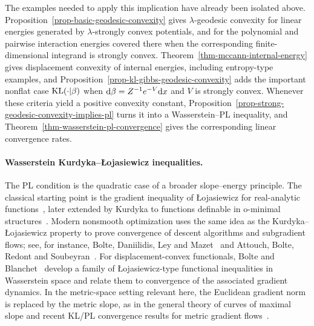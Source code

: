 \begin{rem}\label{rem-classical-convexity-rates}
	The examples needed to apply this implication have already been isolated above. Proposition~\ref{prop-basic-geodesic-convexity} gives \(\lambda\)-geodesic convexity for linear energies generated by \(\lambda\)-strongly convex potentials, and for the polynomial and pairwise interaction energies covered there when the corresponding finite-dimensional integrand is strongly convex. Theorem~\ref{thm-mccann-internal-energy} gives displacement convexity of internal energies, including entropy-type examples, and Proposition~\ref{prop-kl-gibbs-geodesic-convexity} adds the important nonflat case \(\operatorname{KL}(\cdot|\beta)\) when \(\mathrm{d}\beta=Z^{-1}e^{-V}\mathrm{d} x\) and \(V\) is strongly convex. Whenever these criteria yield a positive convexity constant, Proposition~\ref{prop-strong-geodesic-convexity-implies-pl} turns it into a Wasserstein--PL inequality, and Theorem~\ref{thm-wasserstein-pl-convergence} gives the corresponding linear convergence rates.
\end{rem}

\paragraph{Wasserstein Kurdyka--{\L}ojasiewicz inequalities.}
The PL condition is the quadratic case of a broader slope--energy principle. The classical starting point is the gradient inequality of {\L}ojasiewicz for real-analytic functions~\citep{Lojasiewicz1963GradientInequality}, later extended by Kurdyka to functions definable in o-minimal structures~\citep{Kurdyka1998GradientsDefinable}. Modern nonsmooth optimization uses the same idea as the Kurdyka--{\L}ojasiewicz property to prove convergence of descent algorithms and subgradient flows; see, for instance, Bolte, Daniilidis, Ley and Mazet~\citep{BolteDaniilidisLeyMazet2010Lojasiewicz} and Attouch, Bolte, Redont and Soubeyran~\citep{attouch-2010}. For displacement-convex functionals, Bolte and Blanchet~\citep{BolteBlanchet2018LojasiewiczDisplacementConvex} develop a family of {\L}ojasiewicz-type functional inequalities in Wasserstein space and relate them to convergence of the associated gradient dynamics. In the metric-space setting relevant here, the Euclidean gradient norm is replaced by the metric slope, as in the general theory of curves of maximal slope and recent KL/PL convergence results for metric gradient flows~\citep{HauerMazon2019KLSMetric,DelloSchiavoMaasPedrotti2023LocalConditions}.

